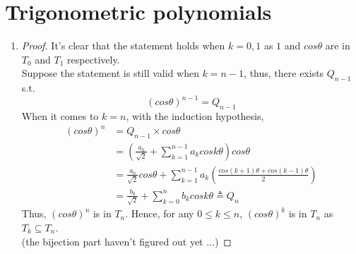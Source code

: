 \documentclass[paper=a4, fontsize=11pt]{scrartcl} %
\numberwithin{equation}{section} %
\numberwithin{figure}{section} %
\numberwithin{table}{section} %
\begin{document}
	
\section{Trigonometric polynomials}
\begin{enumerate}
	\item 
		\begin{proof}
			It's clear that the statement holds when $k=0, 1$ as $1$ and $cos \theta$ are in $T_0$ and $T_1$ respectively.\\
			Suppose the statement is still valid when $k = n-1$, thus, there exists $Q_{n-1}$ s.t.
			\begin{equation}
				(cos\theta)^{n-1} = Q_{n-1}
			\end{equation}
			When it comes to $k = n$, with the induction hypothesis,
			\begin{equation}
				\begin{aligned}
						(cos\theta)^n & =  Q_{n-1} \times cos\theta\\
						                     & = (\frac{a_0}{\sqrt{2}} + \sum_{k=1}^{n-1}a_k cosk\theta) cos\theta\\
						                     & = \frac{a_0}{\sqrt{2}}cos\theta + \sum_{k=1}^{n-1}a_k (\frac{cos(k+1)\theta + cos(k-1)\theta}{2})\\
						                     & = \frac{b_0}{\sqrt{2}} + \sum_{k=0}^{n} b_k cosk\theta \triangleq Q_n
				\end{aligned}
			\end{equation}
			Thus, $(cos\theta)^n$ is in $T_n$. Hence, for any $0 \leq k \leq n$, $(cos\theta)^k$ is in $T_n$ as $T_k \subseteq T_n$.\\
			
			(the bijection part haven't figured out yet ...)
			

\end{proof}
\end{enumerate}
\end{document}
